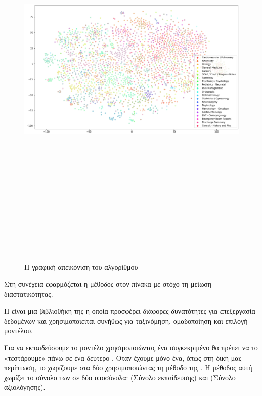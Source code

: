 \begin{figure} [ht!]
\centering
\includegraphics[width=\textwidth,height=20cm,keepaspectratio]{pictures/5.1tsne.png} 
\caption{Η γραφική απεικόνιση του αλγορίθμου }\label{figure5.1}
\end{figure}

Στη συνέχεια εφαρμόζεται η μέθοδος  στον πίνακα  με στόχο τη μείωση διαστατικότητας. 

Η  είναι μια βιβλιοθήκη της  η οποία προσφέρει διάφορες δυνατότητες για επεξεργασία δεδομένων και χρησιμοποιείται συνήθως για ταξινόμηση, ομαδοποίηση και επιλογή μοντέλου. 

Για να εκπαιδεύσουμε το μοντέλο χρησιμοποιώντας ένα συγκεκριμένο  θα πρέπει να το «τεστάρουμε» πάνω σε ένα δεύτερο . Όταν έχουμε μόνο ένα, όπως στη δική μας περίπτωση, το χωρίζουμε στα δύο χρησιμοποιώντας τη μέθοδο  της . 
Η μέθοδος αυτή χωρίζει το σύνολο των  σε δύο υποσύνολα:  (Σύνολο εκπαίδευσης) και  (Σύνολο αξιολόγησης). 

